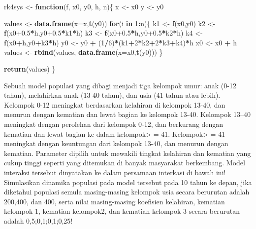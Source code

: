 \documentclass[]{book}
\newenvironment{Shaded}{\begin{snugshade}}{\end{snugshade}}
\newcommand{\ControlFlowTok}[1]{\textcolor[rgb]{0.13,0.29,0.53}{\textbf{#1}}}
\newcommand{\DataTypeTok}[1]{\textcolor[rgb]{0.13,0.29,0.53}{#1}}
\newcommand{\DecValTok}[1]{\textcolor[rgb]{0.00,0.00,0.81}{#1}}
\newcommand{\FloatTok}[1]{\textcolor[rgb]{0.00,0.00,0.81}{#1}}
\newcommand{\KeywordTok}[1]{\textcolor[rgb]{0.13,0.29,0.53}{\textbf{#1}}}
\newcommand{\NormalTok}[1]{#1}
\newcommand{\OperatorTok}[1]{\textcolor[rgb]{0.81,0.36,0.00}{\textbf{#1}}}
\newcommand{\StringTok}[1]{\textcolor[rgb]{0.31,0.60,0.02}{#1}}
\theoremstyle{definition}
\theoremstyle{definition}
\theoremstyle{definition}
\theoremstyle{remark}
\let\BeginKnitrBlock\begin \let\EndKnitrBlock\end
\begin{document}
\begin{Shaded}
\begin{Highlighting}[]
\NormalTok{rk4sys <-}\StringTok{ }\ControlFlowTok{function}\NormalTok{(f, x0, y0, h, n)\{}
\NormalTok{  x <-}\StringTok{ }\NormalTok{x0}
\NormalTok{  y <-}\StringTok{ }\NormalTok{y0}
  
\NormalTok{  values <-}\StringTok{ }\KeywordTok{data.frame}\NormalTok{(}\DataTypeTok{x=}\NormalTok{x,}\KeywordTok{t}\NormalTok{(y0))}
  \ControlFlowTok{for}\NormalTok{(i }\ControlFlowTok{in} \DecValTok{1}\OperatorTok{:}\NormalTok{n)\{}
\NormalTok{    k1 <-}\StringTok{ }\KeywordTok{f}\NormalTok{(x0,y0)}
\NormalTok{    k2 <-}\StringTok{ }\KeywordTok{f}\NormalTok{(x0}\FloatTok{+0.5}\OperatorTok{*}\NormalTok{h,y0}\FloatTok{+0.5}\OperatorTok{*}\NormalTok{k1}\OperatorTok{*}\NormalTok{h)}
\NormalTok{    k3 <-}\StringTok{ }\KeywordTok{f}\NormalTok{(x0}\FloatTok{+0.5}\OperatorTok{*}\NormalTok{h,y0}\FloatTok{+0.5}\OperatorTok{*}\NormalTok{k2}\OperatorTok{*}\NormalTok{h)}
\NormalTok{    k4 <-}\StringTok{ }\KeywordTok{f}\NormalTok{(x0}\OperatorTok{+}\NormalTok{h,y0}\OperatorTok{+}\NormalTok{k3}\OperatorTok{*}\NormalTok{h)}
\NormalTok{    y0 <-}\StringTok{ }\NormalTok{y0 }\OperatorTok{+}\StringTok{ }\NormalTok{(}\DecValTok{1}\OperatorTok{/}\DecValTok{6}\NormalTok{)}\OperatorTok{*}\NormalTok{(k1}\OperatorTok{+}\DecValTok{2}\OperatorTok{*}\NormalTok{k2}\OperatorTok{+}\DecValTok{2}\OperatorTok{*}\NormalTok{k3}\OperatorTok{+}\NormalTok{k4)}\OperatorTok{*}\NormalTok{h}
\NormalTok{    x0 <-}\StringTok{ }\NormalTok{x0 }\OperatorTok{+}\StringTok{ }\NormalTok{h}
\NormalTok{    values <-}\StringTok{ }\KeywordTok{rbind}\NormalTok{(values, }\KeywordTok{data.frame}\NormalTok{(}\DataTypeTok{x=}\NormalTok{x0,}\KeywordTok{t}\NormalTok{(y0)))}
\NormalTok{  \}}
  
  \KeywordTok{return}\NormalTok{(values)}
\NormalTok{\}}
\end{Highlighting}
\end{Shaded}

\BeginKnitrBlock{example}
\protect\hypertarget{exm:rksysexmp}{}{\label{exm:rksysexmp} }Sebuah model populasi yang dibagi menjadi tiga kelompok umur: anak (0-12 tahun), melahirkan anak (13-40 tahun), dan usia (41 tahun atau lebih). Kelompok 0-12 meningkat berdasarkan kelahiran di kelompok 13-40, dan menurun dengan kematian dan lewat bagian ke kelompok 13-40. Kelompok 13--40 meningkat dengan perolehan dari kelompok 0-12, dan berkurang dengan kematian dan lewat bagian ke dalam kelompok\textgreater{} = 41. Kelompok\textgreater{} = 41 meningkat dengan keuntungan dari kelompok 13-40, dan menurun dengan kematian. Parameter dipilih untuk mewakili tingkat kelahiran dan kematian yang cukup tinggi seperti yang ditemukan di banyak masyarakat berkembang. Model interaksi tersebut dinyatakan ke dalam persamaan interkasi di bawah ini! Simulasikan dinamika populasi pada model tersebut pada 10 tahun ke depan, jika diketahui populasi semula masing-masing kelompok usia secara berurutan adalah 200,400, dan 400, serta nilai masing-masing koefisien kelahiran, kematian kelompok 1, kematian kelompok2, dan kematian kelompok 3 secara berurutan adalah 0,5;0,1;0,1;0,25!
\EndKnitrBlock{example}
\end{document}
